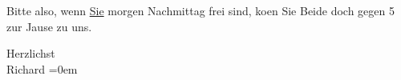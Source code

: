 \pstart
           Bitte also, wenn \uline{Sie} morgen Nachmittag frei sind,
                  ko{\geminationm}en Sie Beide doch gegen 5 zur Jause
               zu uns.\pend
           
\pstart
           Herzlichst{\\[\baselineskip]}\spacefill\mbox{Richard}\pend
           \leftskip=0em{}\endnumbering{}  \newcommand{\dateiname}{L01665}\newcommand{\titel}{Richard Beer-Hofmann an Arthur Schnitzler, 30. 3. 1907}\newcommand{\editorInnen}{Martin Anton Müller und Gerd-Hermann Susen}
